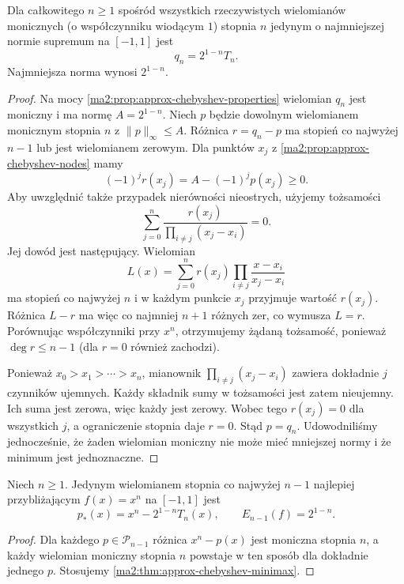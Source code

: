 \begin{twierdzenie}
\label{ma2:thm:approx-chebyshev-minimax}
Dla całkowitego $n\ge1$ spośród wszystkich rzeczywistych
wielomianów monicznych (o współczynniku wiodącym $1$)
stopnia $n$ jedynym o najmniejszej normie
supremum na $[-1,1]$ jest
\[
 q_n=2^{1-n}T_n.
\]
Najmniejsza norma wynosi $2^{1-n}$.
\end{twierdzenie}
\begin{proof}
Na mocy \ref{ma2:prop:approx-chebyshev-properties}
wielomian $q_n$ jest moniczny i ma normę
$A=2^{1-n}$.
Niech $p$ będzie dowolnym wielomianem monicznym
stopnia $n$ z $\|p\|_\infty\le A$.
Różnica $r=q_n-p$ ma stopień co najwyżej $n-1$
lub jest wielomianem zerowym.
Dla punktów $x_j$ z
\ref{ma2:prop:approx-chebyshev-nodes} mamy
\[
 (-1)^j r(x_j)=A-(-1)^j p(x_j)\ge0.
\]
Aby uwzględnić także przypadek nierówności
nieostrych, użyjemy tożsamości
\[
 \sum_{j=0}^n
 \frac{r(x_j)}{\prod_{i\ne j}(x_j-x_i)}=0.
\]
Jej dowód jest następujący.
Wielomian
\[
 L(x)=\sum_{j=0}^n r(x_j)
       \prod_{i\ne j}\frac{x-x_i}{x_j-x_i}
\]
ma stopień co najwyżej $n$ i w każdym punkcie
$x_j$ przyjmuje wartość $r(x_j)$.
Różnica $L-r$ ma więc co najmniej $n+1$
różnych zer, co wymusza $L=r$.
Porównując współczynniki przy $x^n$,
otrzymujemy żądaną tożsamość, ponieważ
$\deg r\le n-1$ (dla $r=0$ również zachodzi).

Ponieważ $x_0>x_1>\cdots>x_n$, mianownik
$\prod_{i\ne j}(x_j-x_i)$ zawiera dokładnie $j$
czynników ujemnych. Każdy składnik sumy
w tożsamości jest zatem nieujemny.
Ich suma jest zerowa, więc każdy jest zerowy.
Wobec tego $r(x_j)=0$ dla wszystkich $j$,
a ograniczenie stopnia daje $r=0$.
Stąd $p=q_n$. Udowodniliśmy jednocześnie,
że żaden wielomian moniczny nie może mieć
mniejszej normy i że minimum jest jednoznaczne.
\end{proof}

\begin{wniosek}
\label{ma2:cor:approx-chebyshev-monomial}
Niech $n\ge1$. Jedynym wielomianem stopnia co najwyżej $n-1$
najlepiej przybliżającym $f(x)=x^n$ na $[-1,1]$
jest
\[
 p_*(x)=x^n-2^{1-n}T_n(x),\qquad
 E_{n-1}(f)=2^{1-n}.
\]
\end{wniosek}
\begin{proof}
Dla każdego $p\in\mathcal P_{n-1}$ różnica
$x^n-p(x)$ jest moniczna stopnia $n$,
a każdy wielomian moniczny stopnia $n$
powstaje w ten sposób dla dokładnie jednego $p$.
Stosujemy \ref{ma2:thm:approx-chebyshev-minimax}.
\end{proof}

